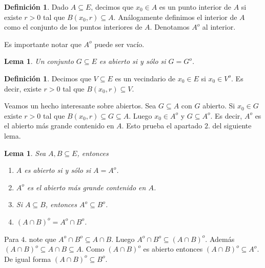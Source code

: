 \documentclass[12pt]{article}
\theoremstyle{plain}
\newtheorem{Lem}[Th]{Lema}             %
\theoremstyle{definition}
\newtheorem{Def}[Th]{Definición}       %
\theoremstyle{remark}
\numberwithin{equation}{section}
\renewcommand{\:}{\colon}           %
\begin{document}
\begin{multicols}{2}
\begin{Def}
  Dado $A\subseteq E$, decimos que $x_0\in A$ es un punto interior de $A$ si existe $r>0$ tal que $B(x_0,r)\subseteq A$. Análogamente definimos el interior de $A$ como el conjunto de los puntos interiores de $A$. Denotamos $A^o$ al interior.
\end{Def}

  Es importante notar que $A^o$ puede ser vacío.


\begin{Lem}
  Un conjunto $G\subseteq E$ es abierto si y sólo si $G=G^o$.
\end{Lem}

\begin{Def}\label{def:vecindarioTopologico}
  Decimos que $V\subseteq E$ es un vecindario de $x_0\in E$ si $x_0\in V^o$. Es decir, existe $r>0$ tal que $B(x_0,r)\subseteq V$.
\end{Def}

Veamos un hecho interesante sobre abiertos. Sea $G\subseteq A$ con $G$ abierto. Si $x_0\in G$ existe $r>0$ tal que $B(x_0,r)\subseteq G\subseteq A$. Luego $x_0\in A^o$ y $G\subseteq A^o$. Es decir, $A^o$ es el abierto más grande contenido en $A$. Esto prueba el apartado $\mathit{2}.$ del siguiente lema.

\begin{Lem}
  Sea $A,B\subseteq E$, entonces
  \begin{enumerate}
    \item $A$ es abierto si y sólo si $A=A^o$.
    \item $A^o$ es el abierto más grande contenido en $A$.
    \item Si $A\subseteq B$, entonces $A^o\subseteq B^o$.
    \item $(A\cap B)^o=A^o\cap B^o$.
  \end{enumerate}
\end{Lem}

\begin{ptcbp}
Para $\mathit{4}.$ note que $A^o\cap B^o\subseteq A\cap B$. Luego $A^o\cap B^o\subseteq (A\cap B)^o$. Además $(A\cap B)^o\subseteq A\cap B\subseteq A$. Como $(A\cap B)^o$ es abierto entonces $(A\cap B)^o\subseteq A^o$. De igual forma $(A\cap B)^o\subseteq B^o$.
\end{ptcbp}


\end{multicols}
\end{document}

